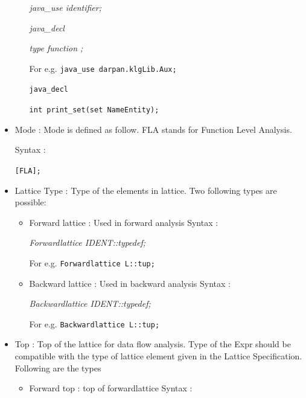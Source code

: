 \documentclass[11pt,a4paper,openright]{report}
\begin{document}
\begin{itemize}
\begin{itemize}
					    \hspace{15mm} \textit{java\_use identifier;}
						    
					    \hspace{15mm} \textit{java\_decl} 

					    \hspace{15mm} \textit{type function ;}

					    \hspace{15mm} For e.g. \texttt{java\_use darpan.klgLib.Aux;}
					    
					    \hspace{31mm}\texttt{java\_decl}
					    
    					    \hspace{30mm} \texttt{int print\_set(set NameEntity);}

	\end{itemize}

	
\item Mode : Mode is defined as follow. FLA stands for Function Level Analysis.

 Syntax : 
			  
		\hspace{15mm} \texttt{[FLA];}
		
\item Lattice Type : Type of the elements in lattice. Two following types are possible:

\begin{itemize}
	\item Forward lattice : Used in forward analysis
			  \newline Syntax : 
			  
					    \hspace{15mm} \textit{Forwardlattice IDENT::typedef;}
					    
					    \hspace{15mm} For e.g. \texttt{Forwardlattice L::tup;}
	\item Backward lattice : Used in backward analysis
	 \newline Syntax : 
			  
					    \hspace{15mm} \textit{Backwardlattice IDENT::typedef;}
						    
					    \hspace{15mm} For e.g. \texttt{Backwardlattice L::tup;}

					   
	
\end{itemize}

\item  Top : Top of the lattice for data flow analysis. Type of the Expr should be compatible with the type of lattice element given in the Lattice Specification. Following are the types
\begin{itemize}
	\item Forward top : top of forwardlattice
			  \newline Syntax : 
			  

\end{itemize}
\end{itemize}
\end{document}
